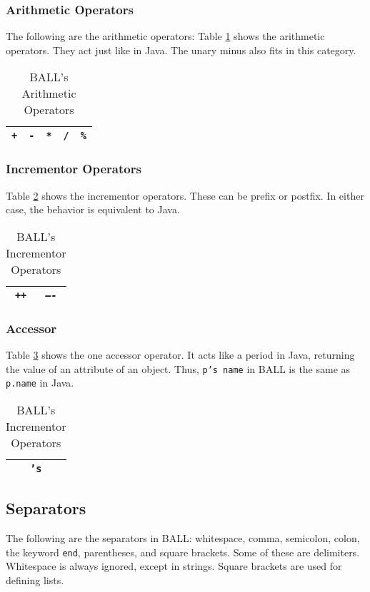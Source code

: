 \subsubsection{Arithmetic Operators}
The following are the arithmetic operators: 
Table \ref{arithmetictable} shows the arithmetic operators. They act just like in Java. The unary minus also fits in this category.
\begin{table}[htdp]
\begin{center}
\begin{tabular}{|c|c|c|c|c|}
\hline
\texttt{+} & \texttt{-} & \texttt{*} & \texttt{/} & \texttt{\%}\\
\hline
\end{tabular}
\caption{BALL's Arithmetic Operators}\label{arithmetictable}
\end{center}
\end{table}%

\subsubsection{Incrementor Operators}
Table \ref{incremtable} shows the incrementor operators. These can be prefix or postfix. In either case, the behavior is equivalent to Java.
\begin{table}[htdp]
\begin{center}
\begin{tabular}{|c|c|}
\hline
\texttt{++} & \texttt{----}\\
\hline
\end{tabular}
\caption{BALL's Incrementor Operators}\label{incremtable}
\end{center}
\end{table}%

\subsubsection{Accessor}
Table \ref{accessortable} shows the one accessor operator. It acts like a period in Java, returning the value of an attribute of an object. Thus, \texttt{p's name} in BALL is the same as \texttt{p.name} in Java.
\begin{table}[htdp]
\begin{center}
\begin{tabular}{|c|}
\hline
\texttt{'s}\\
\hline
\end{tabular}
\caption{BALL's Incrementor Operators}\label{accessortable}
\end{center}
\end{table}%

\subsection{Separators}
The following are the separators in BALL: whitespace, comma, semicolon, colon, the keyword \texttt{end}, parentheses, and square brackets. Some of these are delimiters. Whitespace is always ignored, except in strings. Square brackets are used for defining lists.
